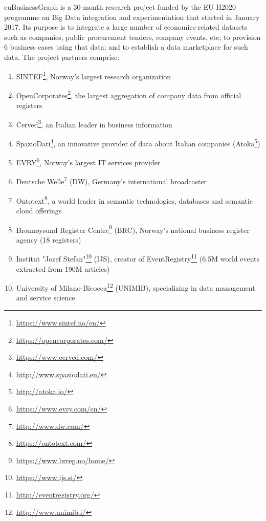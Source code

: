 \documentclass[runningheads,a4paper]{llncs}
\begin{document}
euBusinessGraph is a 30-month research project funded by the EU H2020 programme on Big Data integration and experimentation that started in January 2017. Its purpose is to integrate a large number of economics-related datasets such as companies, public procurement tenders, company events, etc; to provision 6 business cases using that data; and to establish a data marketplace for such data. The project partners comprise:
\begin{enumerate}
\item SINTEF\footnote{\url{https://www.sintef.no/en/}}, Norway's largest research organization
\item OpenCorporates\footnote{\url{https://opencorporates.com/}}, the largest aggregation of company data from official registers
\item Cerved\footnote{\url{https://www.cerved.com/}}, an Italian leader in business information
\item SpazioDati\footnote{\url{http://www.spaziodati.eu/}}, an innovative provider of data about Italian companies (Atoka\footnote{\url{http://atoka.io/}}) 
\item EVRY\footnote{\url{https://www.evry.com/en/}}, Norway's largest IT services provider
\item Deutsche Welle\footnote{\url{http://www.dw.com/}} (DW), Germany's international broadcaster
\item Ontotext\footnote{\url{https://ontotext.com/}}, a world leader in semantic technologies, databases and semantic cloud offerings 
\item Brønnøysund Register Centre\footnote{\url{https://www.brreg.no/home/}} (BRC), Norway's national business register agency (18 registers)
\item Institut "Jozef Stefan"\footnote{\url{https://www.ijs.si/}} (IJS), creator of EventRegistry\footnote{\url{http://eventregistry.org/}} (6.5M world events extracted from 190M articles)
\item University of Milano-Bicocca\footnote{\url{http://www.unimib.i/}} (UNIMIB), specializing in data management and service science
\end{enumerate}
\end{document}
